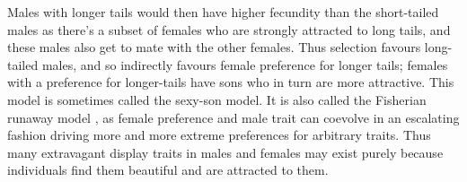 Males with longer tails would then have higher fecundity than
the short-tailed males as there's a subset of females who are strongly
attracted to long tails, and these males also get to mate with the
other females. Thus selection favours long-tailed males, and so indirectly favours
female preference for longer tails; females with a preference
for longer-tails have sons who in turn are more attractive. This
model is sometimes called the sexy-son model. It is also called
the Fisherian runaway model \citep{fisher1915evolution}, as female
preference and male trait can coevolve in an escalating fashion
driving more and more extreme preferences for arbitrary traits. Thus
many extravagant display traits in males and females may exist purely
because individuals find them beautiful and are attracted to them. 





